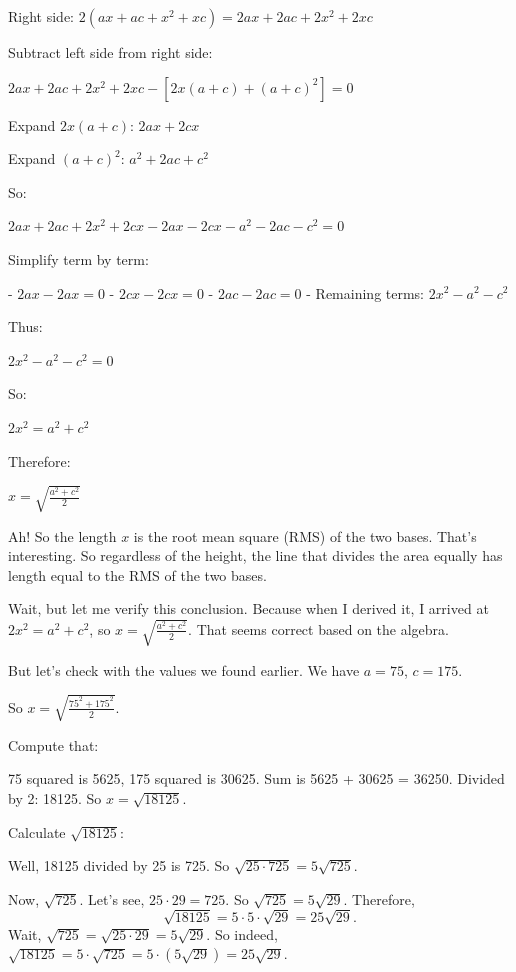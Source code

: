 \begin{tcolorbox}[
  title=Multiagent Collaborative Reasoning Trace Data Sample,
  breakable,
  colback=white,
  colframe=black
]
Right side: \( 2(a x + a c + x^2 + x c) = 2a x + 2a c + 2x^2 + 2x c \)

Subtract left side from right side:

\( 2a x + 2a c + 2x^2 + 2x c - [2x(a + c) + (a + c)^2] = 0 \)

Expand \( 2x(a + c) \): \( 2a x + 2c x \)

Expand \( (a + c)^2 \): \( a^2 + 2a c + c^2 \)

So:

\( 2a x + 2a c + 2x^2 + 2c x - 2a x - 2c x - a^2 - 2a c - c^2 = 0 \)

Simplify term by term:

- \( 2a x - 2a x = 0 \)
- \( 2c x - 2c x = 0 \)
- \( 2a c - 2a c = 0 \)
- Remaining terms: \( 2x^2 - a^2 - c^2 \)

Thus:

\( 2x^2 - a^2 - c^2 = 0 \)

So:

\( 2x^2 = a^2 + c^2 \)

Therefore:

\( x = \sqrt{\frac{a^2 + c^2}{2}} \)

Ah! So the length \( x \) is the root mean square (RMS) of the two bases. That's interesting. So regardless of the height, the line that divides the area equally has length equal to the RMS of the two bases.

Wait, but let me verify this conclusion. Because when I derived it, I arrived at \( 2x^2 = a^2 + c^2 \), so \( x = \sqrt{\frac{a^2 + c^2}{2}} \). That seems correct based on the algebra.

But let's check with the values we found earlier. We have \( a = 75 \), \( c = 175 \).

So \( x = \sqrt{\frac{75^2 + 175^2}{2}} \).

Compute that:

75 squared is 5625, 175 squared is 30625. Sum is 5625 + 30625 = 36250. Divided by 2: 18125. So \( x = \sqrt{18125} \).

Calculate \( \sqrt{18125} \):

Well, 18125 divided by 25 is 725. So \( \sqrt{25 \cdot 725} = 5 \sqrt{725} \).

Now, \( \sqrt{725} \). Let's see, \( 25 \cdot 29 = 725 \). So \( \sqrt{725} = 5 \sqrt{29} \). Therefore, 
\[
\sqrt{18125} = 5 \cdot 5 \cdot \sqrt{29} = 25 \sqrt{29}.
\]
Wait, \( \sqrt{725} = \sqrt{25 \cdot 29} = 5 \sqrt{29} \). So indeed, \( \sqrt{18125} = 5 \cdot \sqrt{725} = 5 \cdot (5 \sqrt{29}) = 25 \sqrt{29} \).


\end{tcolorbox}
